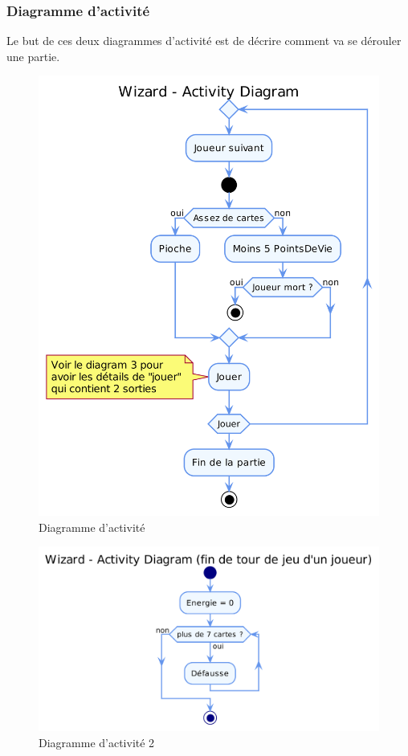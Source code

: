 \documentclass[11pt,a4paper]{article}
\begin{document}
\subsubsection{Diagramme d'activité}
Le but de ces deux diagrammes d'activité est de décrire comment va se dérouler une partie.
\begin{figure}[ht]
  \centering
  \includegraphics[width=1\textwidth]{../uml_files/ActivityDiagram.png}
  \caption{\label{fig:act1} Diagramme d'activité}
\end{figure}

\begin{figure}[ht]
  \centering
  \includegraphics[width=1\textwidth]{../uml_files/ActivityDiagram2.png}
  \caption{\label{fig:act2} Diagramme d'activité 2}
\end{figure}
\end{document}
